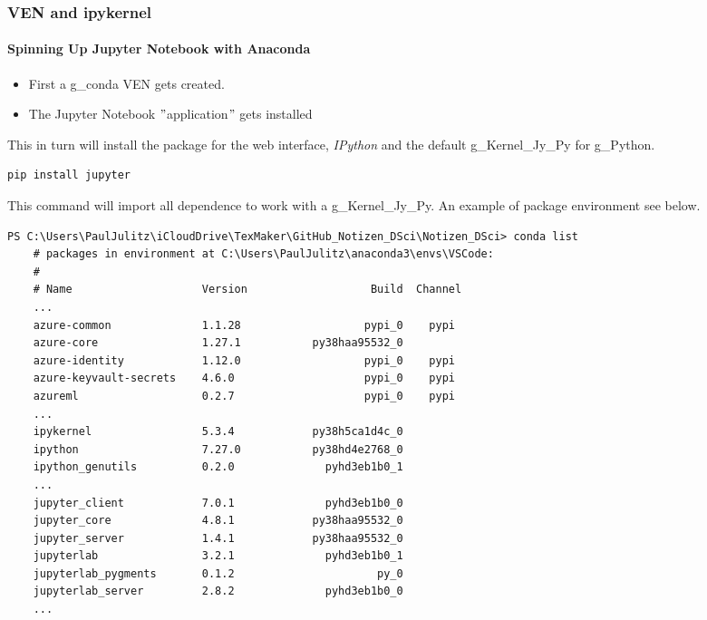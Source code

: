 \subsubsection{VEN and ipykernel}
\paragraph{Spinning Up Jupyter Notebook with Anaconda}
\begin{itemize}
	\item First a \gls{g_conda} \gls{VEN} gets created.
	\item The Jupyter Notebook $"$application$"$ gets installed
\end{itemize}
This in turn will install the package for the web interface, \textit{IPython} and the default \gls{g_Kernel_Jy_Py} for \gls{g_Python}.
\begin{lstlisting}[style=CMD, caption={pip commands to get ready for Jupyter Notebok},captionpos=b]
	pip install jupyter
\end{lstlisting}
This command will import all dependence to work with a \gls{g_Kernel_Jy_Py}. An example of package environment see below.

\begin{lstlisting}[style=CMD, caption={Example Jupyter Notebook conda ven},captionpos=b]
	PS C:\Users\PaulJulitz\iCloudDrive\TexMaker\GitHub_Notizen_DSci\Notizen_DSci> conda list
	# packages in environment at C:\Users\PaulJulitz\anaconda3\envs\VSCode:
	#
	# Name                    Version                   Build  Channel     
	...
	azure-common              1.1.28                   pypi_0    pypi      
	azure-core                1.27.1           py38haa95532_0  
	azure-identity            1.12.0                   pypi_0    pypi      
	azure-keyvault-secrets    4.6.0                    pypi_0    pypi      
	azureml                   0.2.7                    pypi_0    pypi      
	...
	ipykernel                 5.3.4            py38h5ca1d4c_0
	ipython                   7.27.0           py38hd4e2768_0
	ipython_genutils          0.2.0              pyhd3eb1b0_1
	...
	jupyter_client            7.0.1              pyhd3eb1b0_0
	jupyter_core              4.8.1            py38haa95532_0
	jupyter_server            1.4.1            py38haa95532_0
	jupyterlab                3.2.1              pyhd3eb1b0_1
	jupyterlab_pygments       0.1.2                      py_0
	jupyterlab_server         2.8.2              pyhd3eb1b0_0
	...
\end{lstlisting}



